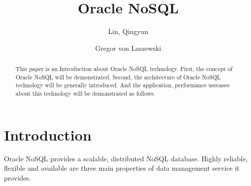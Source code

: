 
\title{Oracle NoSQL}


\author{Lin, Qingyun}


\author{Gregor von Laszewski}


\renewcommand{\shortauthors}{G. v. Laszewski}


\begin{abstract}
This paper is an Introduction about Oracle NoSQL technology. First, the concept of Oracle NoSQL will be demonstrated. Second, the architecture of Oracle NoSQL technology will be generally introduced. And the application, performance usecases about this technology will be demonstrated as follows.
\end{abstract}



\maketitle

\section{Introduction}

Oracle NoSQL provides a scalable, distributed NoSQL database. Highly reliable, flexible and available are three main properties of data management service it provides.

